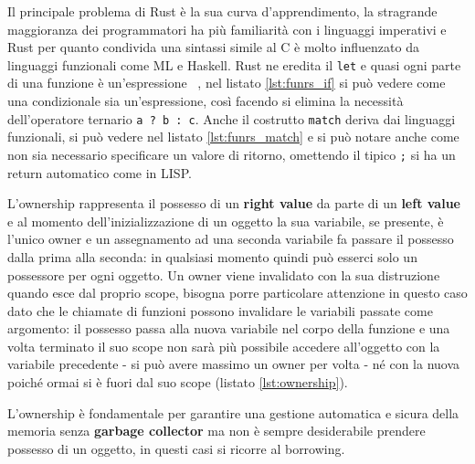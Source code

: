 \documentclass[Lau,binding=0.6cm]{sapthesis}
\newcommand{\textcode}[1]{\colorbox{backcolour}{\texttt{#1}}}
\begin{document}
Il principale problema di Rust è la sua curva d'apprendimento, la stragrande maggioranza dei programmatori ha più familiarità con i linguaggi imperativi e Rust per quanto condivida una sintassi simile al C è molto influenzato da linguaggi funzionali come ML e Haskell. 
Rust ne eredita il \textcode{let} e quasi ogni parte di una funzione è un'espressione ~\cite[1309-1573]{rust:syntax}, nel listato \ref{lst:funrs_if} si può vedere come una condizionale sia un'espressione, così facendo si elimina la necessità dell'operatore ternario \textcode{a ? b : c}.
Anche il costrutto \textcode{match} deriva dai linguaggi funzionali, si può vedere nel listato \ref{lst:funrs_match} e si può notare anche come non sia necessario specificare un valore di ritorno, omettendo il tipico \textcode{;} si ha un return automatico come in LISP.







L'ownership rappresenta il possesso di un \textbf{right value} da parte di un \textbf{left value} e al momento dell'inizializzazione di un oggetto la sua variabile, se presente, è l'unico owner e un assegnamento ad una seconda variabile fa passare il possesso dalla prima alla seconda: in qualsiasi momento quindi può esserci solo un possessore per ogni oggetto. 
Un owner viene invalidato con la sua distruzione quando esce dal proprio scope, bisogna porre particolare attenzione in questo caso dato che le chiamate di funzioni possono invalidare le variabili passate come argomento: il possesso passa alla nuova variabile nel corpo della funzione e una volta terminato il suo scope non sarà più possibile accedere all'oggetto con la variabile precedente - si può avere massimo un owner per volta - né con la nuova poiché ormai si è fuori dal suo scope (listato \ref{lst:ownership}). 



L'ownership è fondamentale per garantire una gestione automatica e sicura della memoria senza \textbf{garbage collector} ma non è sempre desiderabile prendere possesso di un oggetto, in questi casi si ricorre al borrowing.
\end{document}
